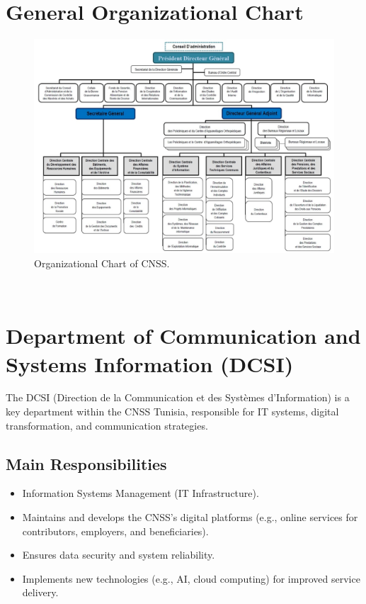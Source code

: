 \section{General Organizational Chart}
\begin{figure}[htbp]
    \centering
    \includegraphics[width=1\textwidth]{figures/orga cnss.jpg} 
    \caption{Organizational Chart of CNSS.}
\end{figure} \ 

\section{Department of Communication and Systems Information (DCSI)}  
The DCSI (Direction de la Communication et des Systèmes d'Information) is a key department within the CNSS Tunisia, responsible for IT systems, digital transformation, and communication strategies.

\subsection{Main Responsibilities}
\begin{itemize}
    \item Information Systems Management (IT Infrastructure).
    \item Maintains and develops the CNSS's digital platforms (e.g., online services for contributors, employers, and beneficiaries).
    \item Ensures data security and system reliability.
    \item Implements new technologies (e.g., AI, cloud computing) for improved service delivery.
\end{itemize}

